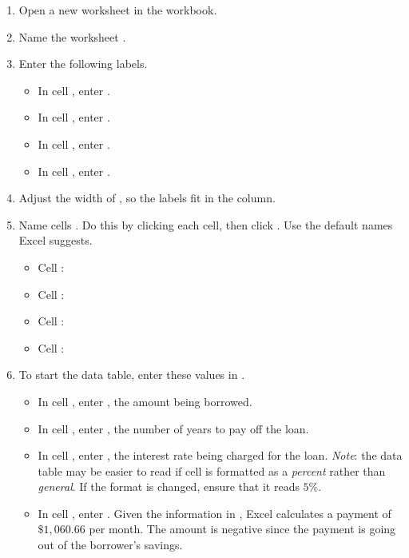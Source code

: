 \begin{enumbox}
	\begin{enumerate}
		\item Open a new worksheet in the  workbook.
		\item Name the worksheet .
		\item Enter the following labels.
		
		\begin{itemize}
			\item In cell , enter .
			\item In cell , enter .
			\item In cell , enter .
			\item In cell , enter .
		\end{itemize}
	
		\item Adjust the width of , so the labels fit in the column.
		\item Name cells . Do this by clicking each cell, then click . Use the default names Excel suggests.
		
		\begin{itemize}
			\item Cell : 
			\item Cell : 
			\item Cell : 
			\item Cell : 
		\end{itemize}
		
		\item To start the data table, enter these values in .
		
		\begin{itemize}
			\item In cell , enter , the amount being borrowed.
			\item In cell , enter , the number of years to pay off the loan.
			\item In cell , enter , the interest rate being charged for the loan. \textit{Note}: the data table may be easier to read if cell  is formatted as a \textit{percent} rather than \textit{general}. If the format is changed, ensure that it reads $ 5\% $.
			\item In cell , enter . Given the information in , Excel calculates a payment of $ \$1,060.66 $ per month. The amount is negative since the payment is going out of the borrower's savings.
		\end{itemize}
	

\end{enumerate}
\end{enumbox}

